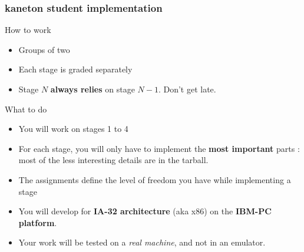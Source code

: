 \begin{frame}
  \frametitle{kaneton student implementation}

  {\Large How to work} \\
  \begin{itemize}
  \item Groups of two
  \item Each stage is graded separately
  \item Stage $N$ \textbf{always relies} on stage $N-1$. Don't get late.
  \end{itemize}

  \-

  {\Large What to do} \\
  \begin{itemize}
  \item You will work on stages 1 to 4
  \item For each stage, you will only have to implement the \textbf{most important} parts : most of the less interesting details are in the tarball.
  \item The assignments define the level of freedom you have while implementing a stage
  \item You will develop for \textbf{IA-32 architecture} (aka x86) on the \textbf{IBM-PC platform}.
  \item Your work will be tested on a \textit{real machine}, and not in an emulator.
  \end{itemize}
\end{frame}

